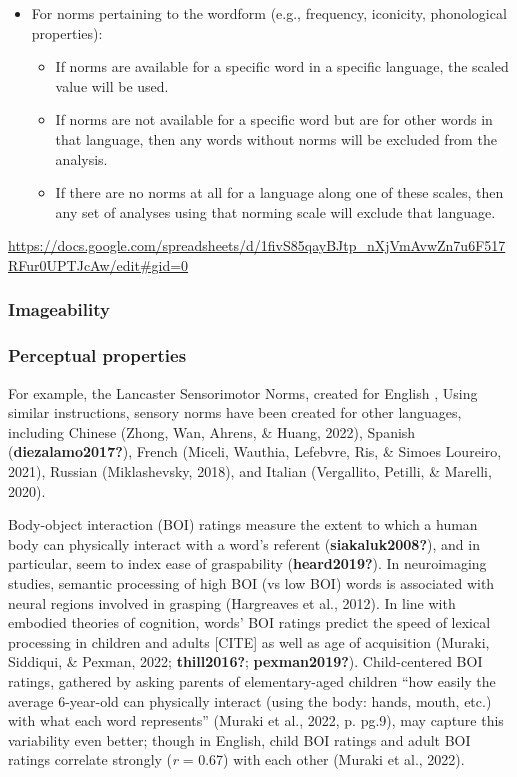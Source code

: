 \documentclass[
  man,floatsintext]{apa6}
\begin{document}
\begin{itemize}
\item
  For norms pertaining to the wordform (e.g., frequency, iconicity, phonological properties):

  \begin{itemize}
  \item
    If norms are available for a specific word in a specific language, the scaled value will be used.
  \item
    If norms are not available for a specific word but are for other words in that language, then any words without norms will be excluded from the analysis.
  \item
    If there are no norms at all for a language along one of these scales, then any set of analyses using that norming scale will exclude that language.
  \end{itemize}
\end{itemize}

\url{https://docs.google.com/spreadsheets/d/1fivS85qayBJtp_nXjVmAvwZn7u6F517RFur0UPTJcAw/edit\#gid=0}

\hypertarget{imageability-1}{%
\subsubsection{Imageability}\label{imageability-1}}

\hypertarget{perceptual-properties}{%
\subsubsection{Perceptual properties}\label{perceptual-properties}}

For example, the Lancaster Sensorimotor Norms, created for English , Using similar instructions, sensory norms have been created for other languages, including Chinese (Zhong, Wan, Ahrens, \& Huang, 2022), Spanish (\textbf{diezalamo2017?}), French (Miceli, Wauthia, Lefebvre, Ris, \& Simoes Loureiro, 2021), Russian (Miklashevsky, 2018), and Italian (Vergallito, Petilli, \& Marelli, 2020).

Body-object interaction (BOI) ratings measure the extent to which a human body can physically interact with a word's referent (\textbf{siakaluk2008?}), and in particular, seem to index ease of graspability (\textbf{heard2019?}). In neuroimaging studies, semantic processing of high BOI (vs low BOI) words is associated with neural regions involved in grasping (Hargreaves et al., 2012). In line with embodied theories of cognition, words' BOI ratings predict the speed of lexical processing in children and adults {[}CITE{]} as well as age of acquisition (Muraki, Siddiqui, \& Pexman, 2022; \textbf{thill2016?}; \textbf{pexman2019?}). Child-centered BOI ratings, gathered by asking parents of elementary-aged children ``how easily the average 6-year-old can physically interact (using the body: hands, mouth, etc.) with what each word represents'' (Muraki et al., 2022, p. pg.9), may capture this variability even better; though in English, child BOI ratings and adult BOI ratings correlate strongly (\emph{r} = 0.67) with each other (Muraki et al., 2022).
\end{document}
